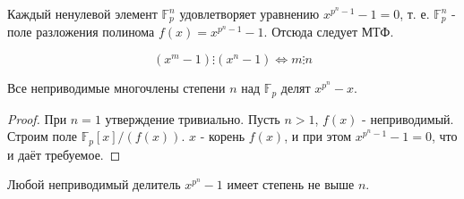 \documentclass[11pt]{article}
\newcounter{th}\setcounter{th}{0}
\def\th{\par\smallskip\refstepcounter{th}\textbf{\arabic{th}}}
\newtheorem*{Theorem}{Теорема \th}
\begin{document}
Каждый ненулевой элемент $\mathbb{F}_p^n$ удовлетворяет уравнению $x^{p^n - 1} - 1 = 0$, т. е.
$\mathbb{F}_p^n$ - поле разложения полинома $f(x) = x^{p^n - 1} - 1$. Отсюда следует МТФ.
\begin{Theorem}
\begin{equation}
(x^m - 1) \vdots (x^n - 1) \Leftrightarrow m \vdots n
\end{equation}
\end{Theorem}
\begin{Theorem}
Все неприводимые многочлены степени $n$ над $\mathbb{F}_p$ делят $x^{p^n} - x$.
\begin{proof}
При $n = 1$ утверждение тривиально. Пусть $n > 1$, $f(x)$ - неприводимый. Строим поле
$\mathbb{F}_p[x] / (f(x))$. $x$ - корень $f(x)$, и при этом $x^{p^n - 1} - 1 = 0$, что и даёт
требуемое.
\end{proof}
\end{Theorem}
\begin{Theorem}
Любой неприводимый делитель $x^{p^n} - 1$ имеет степень не выше $n$.
\end{Theorem}
\end{document}
